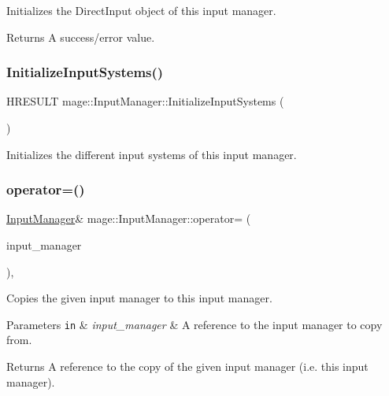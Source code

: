 Initializes the Direct\+Input object of this input manager.

\begin{DoxyReturn}{Returns}
A success/error value. 
\end{DoxyReturn}
\hypertarget{classmage_1_1_input_manager_a34f114c4c667a4a14ce8236b35d308d8}{}\label{classmage_1_1_input_manager_a34f114c4c667a4a14ce8236b35d308d8} 
\subsubsection{\texorpdfstring{Initialize\+Input\+Systems()}{InitializeInputSystems()}}
{\footnotesize\ttfamily H\+R\+E\+S\+U\+LT mage\+::\+Input\+Manager\+::\+Initialize\+Input\+Systems (\begin{DoxyParamCaption}{ }\end{DoxyParamCaption})\hspace{0.3cm}{\ttfamily [protected]}}

Initializes the different input systems of this input manager. \hypertarget{classmage_1_1_input_manager_ad9caa8b7e99a69b774887f342bd5dda0}{}\label{classmage_1_1_input_manager_ad9caa8b7e99a69b774887f342bd5dda0} 
\subsubsection{\texorpdfstring{operator=()}{operator=()}}
{\footnotesize\ttfamily \hyperlink{classmage_1_1_input_manager}{Input\+Manager}\& mage\+::\+Input\+Manager\+::operator= (\begin{DoxyParamCaption}\item[{const \hyperlink{classmage_1_1_input_manager}{Input\+Manager} \&}]{input\+\_\+manager }\end{DoxyParamCaption})\hspace{0.3cm}{\ttfamily [private]}, {\ttfamily [delete]}}

Copies the given input manager to this input manager.


\begin{DoxyParams}[1]{Parameters}
\mbox{\tt in}  & {\em input\+\_\+manager} & A reference to the input manager to copy from. \\
\hline
\end{DoxyParams}
\begin{DoxyReturn}{Returns}
A reference to the copy of the given input manager (i.\+e. this input manager). 
\end{DoxyReturn}
\hypertarget{classmage_1_1_input_manager_a5e516969ff4ae9876b98c28f48f93726}{}\label{classmage_1_1_input_manager_a5e516969ff4ae9876b98c28f48f93726} 

